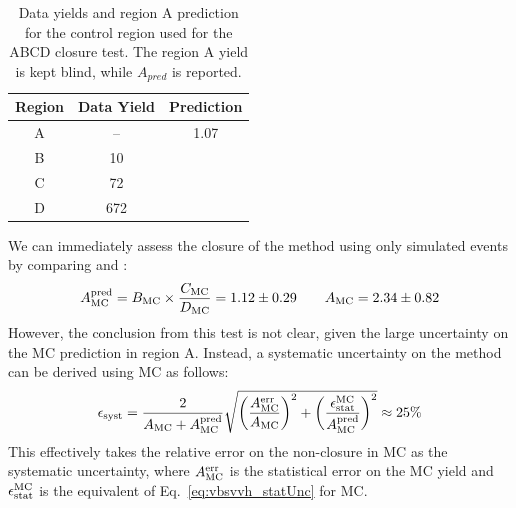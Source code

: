 \begin{table}[htbp]
    \centering
    \caption[VBS $\VVH$ ABCD yields]{
        Data yields and region A prediction for the control region used for the ABCD closure test. 
        The region A yield is kept blind, while $A_{pred}$ is reported.
    }
    \begin{tabular}{ccc}
    \toprule
    \textbf{Region} & Data Yield & Prediction \\
    \midrule
    A               & --         & 1.07       \\
    B               & 10         &            \\
    C               & 72         &            \\
    D               & 672        &            \\
    \bottomrule
    \end{tabular}
    \label{tab:0lepABCDregion}
\end{table}

We can immediately assess the closure of the method using only simulated events by comparing \AMCPred and \AMC:
\begin{equation*}
    \AMCPred = \BMC\times\frac{\CMC}{\DMC} = 1.12\pm0.29 \qquad \AMC = 2.34\pm0.82 %
\end{equation*}
However, the conclusion from this test is not clear, given the large uncertainty on the MC prediction in region A. 
Instead, a systematic uncertainty on the method \Esyst can be derived using MC as follows:
\begin{equation}
    \Esyst = 
        \frac{2}{\AMC + \AMCPred}
        \sqrt{\bigg(\frac{\AMC^\text{err}}{\AMC}\bigg)^2 + \bigg(\frac{\Estat^\mathrm{MC}}{\AMCPred}\bigg)^2} \approx 25\% %
\end{equation}
This effectively takes the relative error on the non-closure in MC as the systematic uncertainty, where $A_{\mathrm{MC}}^\text{err}$ is the statistical error on the MC yield and $\epsilon_{\text{stat}}^\mathrm{MC}$ is the equivalent of Eq.~\ref{eq:vbsvvh_statUnc} for MC.

